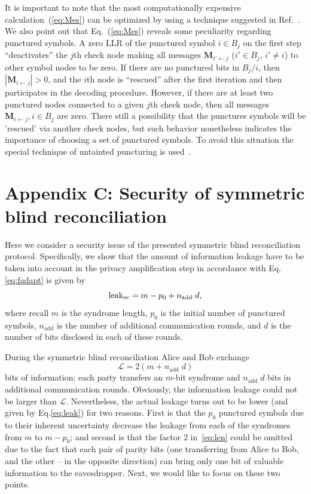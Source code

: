 \documentclass[aps,pra,twocolumn,amsmath,amssymb,nofootinbib,showpacs,superscriptaddress]{revtex4-1}
\newcommand{\Mb}{\mathbf{M}}
\begin{document}
It is important to note that the most computationally expensive calculation~(\ref{eq:Mes}) can be optimized by using a technique suggested in Ref.~\cite{Decodoptim}.
We also point out that Eq.~(\ref{eq:Mes}) reveals some peculiarity regarding punctured symbols.
A zero LLR of the punctured symbol $i\in B_j$ on the first step ``deactivates'' the $j$th check node making all messages $\Mb_{i'\leftarrow j}$ ($i'\in B_j$, $i'\neq i$) to other symbol nodes to be zero.
If there are no punctured bits in $B_j/i$, then $|\Mb_{i\leftarrow j}|>0$, and the $i$th node is ``rescued'' after the first iteration and then participates in the decoding procedure. 
However, if there are at least two punctured nodes connected to a given $j$th check node, then all messages $\Mb_{i\leftarrow j}, i\in B_j$ are zero.
There still a possibility that the punctures symbols will be 'rescued' via another check nodes, but such behavior nonetheless indicates the importance of choosing a set of punctured symbols.
To avoid this situation the special technique of untainted puncturing is used~\cite{UntP}.

\setcounter{equation}{0}
\renewcommand{\theequation}{C\arabic{equation}}

\section*{Appendix C: Security of symmetric blind reconciliation}
Here we consider a security issue of the presented symmetric blind reconciliation protocol.
Specifically, we show that the amount of information leakage have to be taken into account in the privacy amplification step in accordance with Eq.\eqref{eq:fadapt} is given by
\begin{equation} \label{eq:leak}
	{\rm leak}_{\rm ec}=m-p_0+n_\mathrm{add}\;d,
\end{equation}  
where recall $m$ is the syndrome length, $p_0$ is the initial number of punctured symbols, $n_\mathrm{add}$ is the number of additional communication rounds, 
and $d$ is the number of bits disclosed in each of these rounds.

During the symmetric blind reconciliation Alice and Bob exchange 
\begin{equation}\label{eq:len}
	\mathcal{L} = 2(m+n_\mathrm{add}\;d)
\end{equation}
bits of information: each party transfers an $m$-bit syndrome and  $n_\mathrm{add}\;d$ bits in additional communication rounds.
Obviously, the information leakage could not be larger than $\mathcal{L}$.
Nevertheless, the actual leakage turns out to be lower (and given by Eq.\eqref{eq:leak}) for two reasons.
First is that the $p_0$ punctured symbols due to their inherent uncertainty decrease the leakage from each of the syndromes from $m$ to $m-p_0$; 
and second is that the factor 2 in~\eqref{eq:len} could be omitted due to the fact that each pair of parity bits 
(one transferring from Alice to Bob, and the other -- in the opposite direction) can bring only one bit of valuable information to the eavesdropper.
Next, we would like to focus on these two points.
\end{document}
